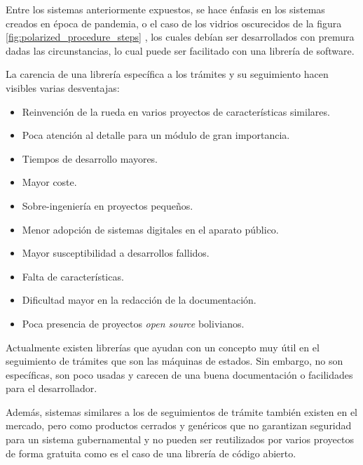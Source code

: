 Entre los sistemas anteriormente expuestos, se hace énfasis en los sistemas
creados en época de pandemia, o el caso de los vidrios oscurecidos de la figura
\ref{fig:polarized_procedure_steps} , los cuales debían ser desarrollados con
premura dadas las circunstancias, lo cual puede ser facilitado con una librería
de software.

La carencia de una librería específica a los trámites y su seguimiento hacen
visibles varias desventajas:

\begin{itemize}
    \item Reinvención de la rueda en varios proyectos de características
          similares.

    \item Poca atención al detalle para un módulo de gran importancia.

    \item Tiempos de desarrollo mayores.

    \item Mayor coste.

    \item Sobre-ingeniería en proyectos pequeños.

    \item Menor adopción de sistemas digitales en el aparato público.

    \item Mayor susceptibilidad a desarrollos fallidos.

    \item Falta de características.

    \item Dificultad mayor en la redacción de la documentación.

    \item Poca presencia de proyectos \textit{open source} bolivianos.
\end{itemize}

Actualmente existen librerías que ayudan con un concepto muy útil en el
seguimiento de trámites que son las máquinas de estados. Sin embargo, no son
específicas, son poco usadas y carecen de una buena documentación o facilidades
para el desarrollador.

Además, sistemas similares a los de seguimientos de trámite también existen en
el mercado, pero como productos cerrados y genéricos que no garantizan seguridad
para un sistema gubernamental y no pueden ser reutilizados por varios proyectos
de forma gratuita como es el caso de una librería de código abierto.

